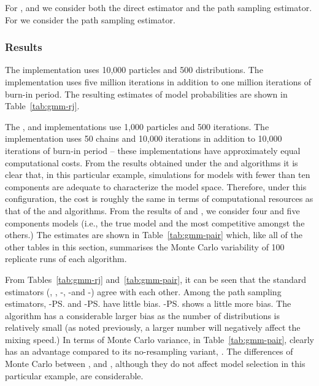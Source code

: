 For \smc[2], \smc[3] and \ais we consider both the direct estimator and the
path sampling estimator. For \pmcmc we consider the path sampling estimator.

\subsubsection{Results}
\label{sec:gmm_res}

The \smc[1] implementation uses 10,000 particles and 500 distributions. The
\rjmcmc implementation uses five million iterations in addition to one million
iterations of burn-in period. The resulting estimates of model probabilities
are shown in Table~\ref{tab:gmm-rj}.

The \smc[2], \smc[3] and \ais implementations use 1,000 particles and 500
iterations. The \pmcmc implementation uses 50 chains and 10,000 iterations in
addition to 10,000 iterations of burn-in period -- these implementations have
approximately equal computational costs. From the results obtained under the
\smc[1] and \rjmcmc algorithms it is clear that, in this particular example,
simulations for models with fewer than ten components are adequate to
characterize the model space. Therefore, under this configuration, the cost is
roughly the same in terms of computational resources as that of the \smc[1]
and \rjmcmc algorithms. From the results of \rjmcmc and \smc[1], we consider
four and five components models (i.e., the true model and the most competitive
amongst the others.) The estimates are shown in Table~\ref{tab:gmm-pair}
which, like all of the other tables in this section, summarises the Monte
Carlo variability of 100 replicate runs of each algorithm.




From Tables~\ref{tab:gmm-rj} and~\ref{tab:gmm-pair}, it can be seen that the
standard estimators (\rjmcmc, \smc[1], \smc[2]-\ds, \smc[3]-\ds and \ais-\ds)
agree with each other. Among the path sampling estimators, \smc[2]-\ps and
\ais-\ps have little bias. \smc[3]-\ps shows a little more bias. The \pmcmc
algorithm has a considerable larger bias as the number of distributions is
relatively small (as noted previously, a larger number will negatively affect
the mixing speed.) In terms of Monte Carlo variance, in
Table~\ref{tab:gmm-pair}, \smc[2] clearly has an advantage compared to its
no-resampling variant, \ais. The differences of Monte Carlo \sd between
\smc[2], \smc[3] and \pmcmc, although they do not affect model selection in
this particular example, are considerable.

